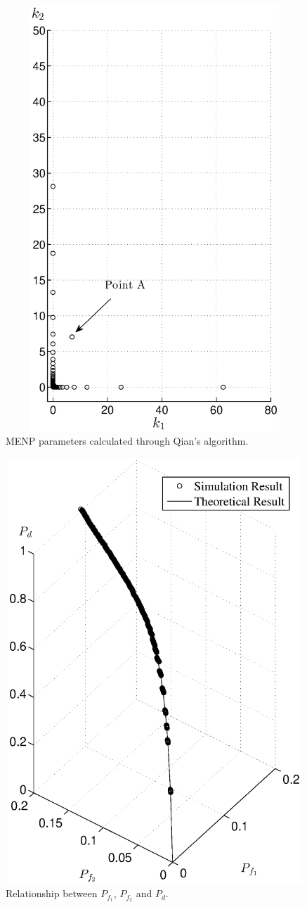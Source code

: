 \begin{figure}[!t]
  \centering 
  \includegraphics[width=12cm, height=16cm]{4/k1k2.eps}
  \caption{MENP parameters calculated through Qian's algorithm.}
  \label{pic:15may10a2}
\end{figure}

\begin{figure}[!t]
  \centering 
  \includegraphics[width=12cm, height=16cm]{4/Cypf1pf2pd.eps}
  \caption{Relationship between $P_{f_1}$, $P_{f_2}$ and $P_d$.}
  \label{pic:15may10a3}
\end{figure}
